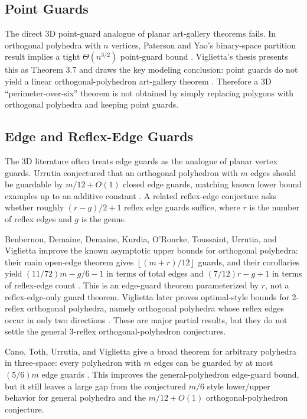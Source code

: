 \documentclass[11pt]{article}
\newcommand{\floor}[1]{\left\lfloor #1 \right\rfloor}
\begin{document}
\subsection{Point Guards}

The direct 3D point-guard analogue of planar art-gallery theorems fails.  In
orthogonal polyhedra with $n$ vertices, Paterson and Yao's binary-space
partition result implies a tight $\Theta(n^{3/2})$ point-guard bound
\cite{PatersonYao1992}.  Viglietta's thesis presents this as Theorem 3.7 and
draws the key modeling conclusion: point guards do not yield a linear
orthogonal-polyhedron art-gallery theorem \cite{VigliettaThesis}.  Therefore a
3D ``perimeter-over-six'' theorem is not obtained by simply replacing polygons
with orthogonal polyhedra and keeping point guards.

\subsection{Edge and Reflex-Edge Guards}

The 3D literature often treats edge guards as the analogue of planar vertex
guards.  Urrutia conjectured that an orthogonal polyhedron with $m$ edges
should be guardable by $m/12+O(1)$ closed edge guards, matching known lower
bound examples up to an additive constant \cite{VigliettaThesis}.  A related
reflex-edge conjecture asks whether roughly $(r-g)/2+1$ reflex edge guards
suffice, where $r$ is the number of reflex edges and $g$ is the genus.

Benbernou, Demaine, Demaine, Kurdia, O'Rourke, Toussaint, Urrutia, and
Viglietta improve the known asymptotic upper bounds for orthogonal polyhedra:
their main open-edge theorem gives $\floor{(m+r)/12}$ guards, and their
corollaries yield $(11/72)m-g/6-1$ in terms of total edges and
$(7/12)r-g+1$ in terms of reflex-edge count
\cite[Theorem~5 and Corollaries~6--7]{BenbernouEtAl2011}.  This is an
edge-guard theorem parameterized by $r$, not a reflex-edge-only guard theorem.
Viglietta later proves
optimal-style bounds for 2-reflex orthogonal polyhedra, namely orthogonal
polyhedra whose reflex edges occur in only two directions
\cite{Viglietta2020}.  These are major partial results, but they do not settle
the general 3-reflex orthogonal-polyhedron conjectures.

Cano, Toth, Urrutia, and Viglietta give a broad theorem for arbitrary
polyhedra in three-space: every polyhedron with $m$ edges can be guarded by at
most $(5/6)m$ edge guards \cite{CanoTothUrrutiaViglietta2022}.  This improves
the general-polyhedron edge-guard bound, but it still leaves a large gap from
the conjectured $m/6$ style lower/upper behavior for general polyhedra and the
$m/12+O(1)$ orthogonal-polyhedron conjecture.
\end{document}
